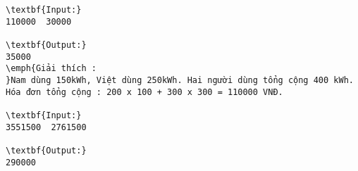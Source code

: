 \begin{verbatim}
\textbf{Input:}
110000  30000

\textbf{Output:}
35000
\emph{Giải thích : 
}Nam dùng 150kWh, Việt dùng 250kWh. Hai người dùng tổng cộng 400 kWh. 
Hóa đơn tổng cộng : 200 x 100 + 300 x 300 = 110000 VNĐ.

\textbf{Input:}
3551500  2761500

\textbf{Output:}
290000

\end{verbatim}

\emph{ }